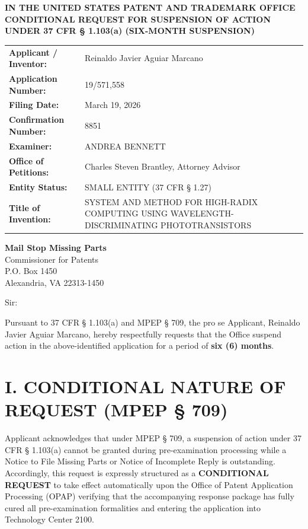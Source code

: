 \documentclass[11pt,letterpaper]{article}
\begin{document}
\thispagestyle{empty}

\begin{center}
    \textbf{\large IN THE UNITED STATES PATENT AND TRADEMARK OFFICE} \\
    \vspace{0.3cm}
    \textbf{\large CONDITIONAL REQUEST FOR SUSPENSION OF ACTION} \\
    \textbf{\normalsize UNDER 37 CFR \S{} 1.103(a) (SIX-MONTH SUSPENSION)}
\end{center}

\vspace{0.4cm}
\noindent\begin{tabular}{p{2.3in}p{4.0in}}
\textbf{Applicant / Inventor:} & Reinaldo Javier Aguiar Marcano \\
\textbf{Application Number:} & 19/571,558 \\
\textbf{Filing Date:} & March 19, 2026 \\
\textbf{Confirmation Number:} & 8851 \\
\textbf{Examiner:} & ANDREA BENNETT \\
\textbf{Office of Petitions:} & Charles Steven Brantley, Attorney Advisor \\
\textbf{Entity Status:} & SMALL ENTITY (37 CFR \S{} 1.27) \\
\textbf{Title of Invention:} & SYSTEM AND METHOD FOR HIGH-RADIX COMPUTING USING WAVELENGTH-DISCRIMINATING PHOTOTRANSISTORS \\
\end{tabular}

\vspace{0.5cm}
\noindent\textbf{Mail Stop Missing Parts} \\
Commissioner for Patents \\
P.O. Box 1450 \\
Alexandria, VA 22313-1450

\vspace{0.2cm}
Sir:

Pursuant to 37 CFR \S{} 1.103(a) and MPEP \S{} 709, the pro se Applicant, Reinaldo Javier Aguiar Marcano, hereby respectfully requests that the Office suspend action in the above-identified application for a period of \textbf{six (6) months}.

\section*{I. CONDITIONAL NATURE OF REQUEST (MPEP \S{} 709)}

Applicant acknowledges that under MPEP \S{} 709, a suspension of action under 37 CFR \S{} 1.103(a) cannot be granted during pre-examination processing while a Notice to File Missing Parts or Notice of Incomplete Reply is outstanding. Accordingly, this request is expressly structured as a \textbf{CONDITIONAL REQUEST} to take effect automatically upon the Office of Patent Application Processing (OPAP) verifying that the accompanying response package has fully cured all pre-examination formalities and entering the application into Technology Center 2100.
\end{document}

